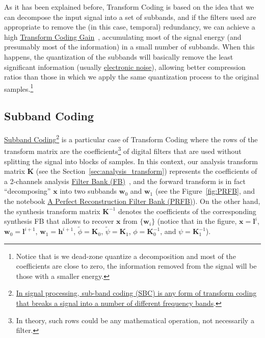 As it has been explained before, Transform Coding is based on the idea
that we can decompose the input signal into a set of subbands, and if
the filters used are appropriate to remove the (in this case,
temporal) redundancy, we can achieve a high
\href{https://web.stanford.edu/class/ee398a/handouts/lectures/07-TransformCoding.pdf}{Transform
  Coding Gain}~\cite{sayood2017introduction}, accumulating most of the
signal energy (and presumably most of the information) in a small
number of subbands. When this happens, the quantization of the
subbands will basically remove the least significant information
(usually
\href{https://en.wikipedia.org/wiki/Noise_(electronics)}{electronic
  noise}), allowing better compression ratios than those in which we
apply the same quantization process to the original
samples.\footnote{Notice that is we dead-zone quantize a decomposition
and most of the coefficients are close to zero, the information
removed from the signal will be those with a smaller energy.}


\subsection{Subband Coding}


\href{https://en.wikipedia.org/wiki/Sub-band_coding}{Subband
  Coding}\footnote{\href{https://en.wikipedia.org/wiki/Sub-band_coding}{In
    signal processing, sub-band coding (SBC) is any form of transform
    coding that breaks a signal into a number of different frequency
    bands}.} is a particular case of Transform Coding where the rows
of the transform matrix are the coefficients\footnote{In theory, such
  rows could be any mathematical operation, not necessarily a filter.}
of digital filters that are used without splitting the signal into
blocks of samples. In this context, our analysis transform matrix
${\mathbf K}$ (see the Section~\ref{sec:analysis_transform})
represents the coefficients of a 2-channels analysis
\href{https://en.wikipedia.org/wiki/Filter_bank}{Filter Bank
  (FB)}~\cite{vetterli1995wavelets}, and the forward transform is in
fact ``decomposing'' ${\mathbf x}$ into two subbands ${\mathbf w}_0$
and ${\mathbf w}_1$ (see the Figure~\ref{fig:PRFB}, and the notebook
\href{https://github.com/Tecnologias-multimedia/Tecnologias-multimedia.github.io/blob/master/contents/transform_coding/PRFB.ipynb}{A
  Perfect Reconstruction Filter Bank (PRFB)}). On the other hand, the
synthesis transform matrix ${\mathbf K}^{-1}$ denotes the coefficients
of the corresponding synthesis FB that allows to recover ${\mathbf x}$
from $\{{\mathbf w}_i\}$ (notice that in the figure,
${\mathbf x}={\mathbf l}^i$, ${\mathbf w}_0={\mathbf l}^{i+1}$,
${\mathbf w}_1={\mathbf h}^{i+1}$, $\tilde\phi={\mathbf K}_0$,
$\tilde\psi={\mathbf K}_1$, $\phi={\mathbf K}^{-1}_0$, and
$\psi={\mathbf K}^{-1}_1$).

